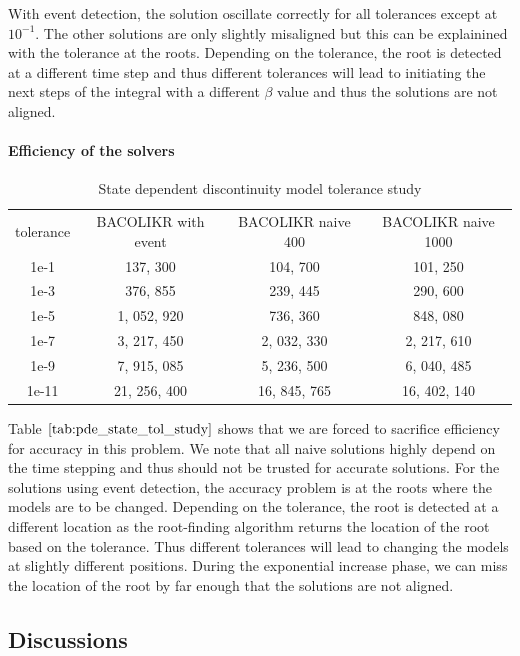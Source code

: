 \documentclass{article}
\begin{document}
With event detection, the solution oscillate correctly for all tolerances except at $10^{-1}$. The other solutions are only slightly misaligned but this can be explainined with the tolerance at the roots. Depending on the tolerance, the root is detected at a different time step and thus different tolerances will lead to initiating the next steps of the integral with a different $\beta$ value and thus the solutions are not aligned. 

\paragraph{Efficiency of the solvers}
\begin{table}[h]
\caption {State dependent discontinuity model tolerance study} 
\label{tab:pde_state_tol_study}
\begin{center}
\begin{tabular}{ c c c c } 
tolerance  & BACOLIKR  with event & BACOLIKR naive 400 & BACOLIKR naive 1000 \\ 
1e-1       & 137, 300             & 104, 700           & 101, 250  \\
1e-3       & 376, 855             & 239, 445           & 290, 600  \\
1e-5       & 1, 052, 920          & 736, 360           & 848, 080\\
1e-7       & 3, 217, 450          & 2, 032, 330        & 2, 217, 610 \\
1e-9       & 7, 915, 085          & 5, 236, 500        & 6, 040, 485\\
1e-11      & 21, 256, 400         & 16, 845, 765       & 16, 402, 140  \\
\end{tabular}
\end{center}
\end{table}

Table $\ref{tab:pde_state_tol_study}$ shows that we are forced to sacrifice efficiency for accuracy in this problem. We note that all naive solutions highly depend on the time stepping and thus should not be trusted for accurate solutions. For the solutions using event detection, the accuracy problem is at the roots where the models are to be changed. Depending on the tolerance, the root is detected at a different location as the root-finding algorithm returns the location of the root based on the tolerance. Thus different tolerances will lead to changing the models at slightly different positions. During the exponential increase phase, we can miss the location of the root by far enough that the solutions are not aligned.

\subsection{Discussions}
\label{subsection:pde_discussions}
\end{document}
